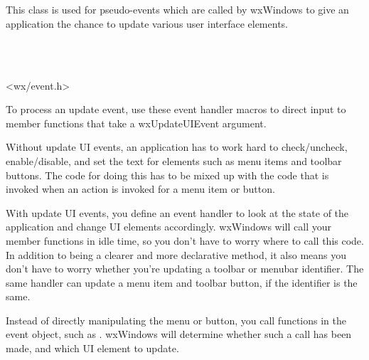 \section{}\label{wxupdateuievent}

This class is used for pseudo-events which are called by wxWindows
to give an application the chance to update various user interface elements.


\\
\\


<wx/event.h>


To process an update event, use these event handler macros to direct input to member
functions that take a wxUpdateUIEvent argument.

\twocolwidtha{7cm}
\begin{twocollist}\itemsep=0pt
\end{twocollist}%


Without update UI events, an application has to work hard to check/uncheck, enable/disable,
and set the text for elements such as menu items and toolbar buttons.
The code for doing this has to be mixed up with the code that is invoked when
an action is invoked for a menu item or button.

With update UI events, you define an event handler to look at the state of
the application and change UI elements accordingly. wxWindows will call your
member functions in idle time, so you don't have to worry where to call this code.
In addition to being a clearer and more declarative method, it also means you
don't have to worry whether you're updating a toolbar or menubar identifier.
The same handler can update a menu item and toolbar button, if the identifier is the same.

Instead of directly manipulating the menu or button, you call functions in the event
object, such as . wxWindows
will determine whether such a call has been made, and which UI element to update.

